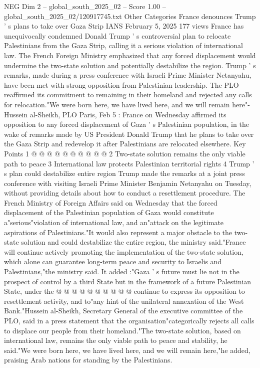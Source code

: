 \begin{textsample}{NEG Dim 2 – global\_south\_2025\_02 – Score 1.00 – global\_south\_2025\_02/120917745.txt}  \label{ex:f2_neg_022}
Other Categories France denounces Trump ' s plans to take over Gaza Strip IANS February 5, 2025 177 views France has unequivocally condemned Donald Trump ' s controversial plan to relocate Palestinians from the Gaza Strip, calling it a serious violation of international law.
The French Foreign Ministry emphasized that any forced displacement would undermine the two-state solution and potentially destabilize the region.
Trump ' s remarks, made during a press conference with Israeli Prime Minister Netanyahu, have been met with strong opposition from Palestinian leadership.
The PLO reaffirmed its commitment to remaining in their homeland and rejected any calls for relocation."We were born here, we have lived here, and we will remain here"- Hussein al-Sheikh, PLO Paris, Feb 5 : France on Wednesday affirmed its opposition to any forced displacement of Gaza ' s Palestinian population, in the wake of remarks made by US President Donald Trump that he plans to take over the Gaza Strip and redevelop it after Palestinians are relocated elsewhere.
Key Points 1 @ @ @ @ @ @ @ @ @ @ 2 Two-state solution remains the only viable path to peace 3 International law protects Palestinian territorial rights 4 Trump ' s plan could destabilize entire region Trump made the remarks at a joint press conference with visiting Israeli Prime Minister Benjamin Netanyahu on Tuesday, without providing details about how to conduct a resettlement procedure.
The French Ministry of Foreign Affairs said on Wednesday that the forced displacement of the Palestinian population of Gaza would constitute a"serious"violation of international law, and an"attack on the legitimate aspirations of Palestinians."It would also represent a major obstacle to the two-state solution and could destabilize the entire region, the ministry said."France will continue actively promoting the implementation of the two-state solution, which alone can guarantee long-term peace and security to Israelis and Palestinians,"the ministry said.
It added :"Gaza ' s future must lie not in the prospect of control by a third State but in the framework of a future Palestinian State, under the @ @ @ @ @ @ @ @ @ @ continue to express its opposition to resettlement activity, and to"any hint of the unilateral annexation of the West Bank."Hussein al-Sheikh, Secretary General of the executive committee of the PLO, said in a press statement that the organisation"categorically rejects all calls to displace our people from their homeland."The two-state solution, based on international law, remains the only viable path to peace and stability, he said."We were born here, we have lived here, and we will remain here,"he added, praising Arab nations for standing by the Palestinians.

\end{textsample}
